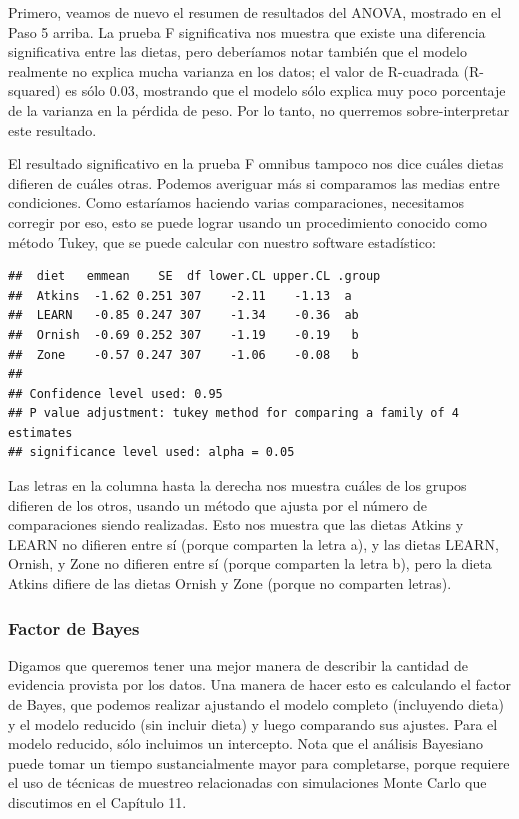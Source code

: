 \documentclass[
  12pt,
]{book}
\begin{document}
Primero, veamos de nuevo el resumen de resultados del ANOVA, mostrado en el Paso 5 arriba. La prueba F significativa nos muestra que existe una diferencia significativa entre las dietas, pero deberíamos notar también que el modelo realmente no explica mucha varianza en los datos; el valor de R-cuadrada (R-squared) es sólo 0.03, mostrando que el modelo sólo explica muy poco porcentaje de la varianza en la pérdida de peso. Por lo tanto, no querremos sobre-interpretar este resultado.

El resultado significativo en la prueba F omnibus tampoco nos dice cuáles dietas difieren de cuáles otras. Podemos averiguar más si comparamos las medias entre condiciones. Como estaríamos haciendo varias comparaciones, necesitamos corregir por eso, esto se puede lograr usando un procedimiento conocido como método Tukey, que se puede calcular con nuestro software estadístico:

\begin{verbatim}
##  diet   emmean    SE  df lower.CL upper.CL .group
##  Atkins  -1.62 0.251 307    -2.11    -1.13  a    
##  LEARN   -0.85 0.247 307    -1.34    -0.36  ab   
##  Ornish  -0.69 0.252 307    -1.19    -0.19   b   
##  Zone    -0.57 0.247 307    -1.06    -0.08   b   
## 
## Confidence level used: 0.95 
## P value adjustment: tukey method for comparing a family of 4 estimates 
## significance level used: alpha = 0.05
\end{verbatim}

Las letras en la columna hasta la derecha nos muestra cuáles de los grupos difieren de los otros, usando un método que ajusta por el número de comparaciones siendo realizadas. Esto nos muestra que las dietas Atkins y LEARN no difieren entre sí (porque comparten la letra a), y las dietas LEARN, Ornish, y Zone no difieren entre sí (porque comparten la letra b), pero la dieta Atkins difiere de las dietas Ornish y Zone (porque no comparten letras).

\hypertarget{factor-de-bayes}{%
\subsubsection{Factor de Bayes}\label{factor-de-bayes}}

Digamos que queremos tener una mejor manera de describir la cantidad de evidencia provista por los datos. Una manera de hacer esto es calculando el factor de Bayes, que podemos realizar ajustando el modelo completo (incluyendo dieta) y el modelo reducido (sin incluir dieta) y luego comparando sus ajustes. Para el modelo reducido, sólo incluimos un intercepto. Nota que el análisis Bayesiano puede tomar un tiempo sustancialmente mayor para completarse, porque requiere el uso de técnicas de muestreo relacionadas con simulaciones Monte Carlo que discutimos en el Capítulo 11.
\end{document}
